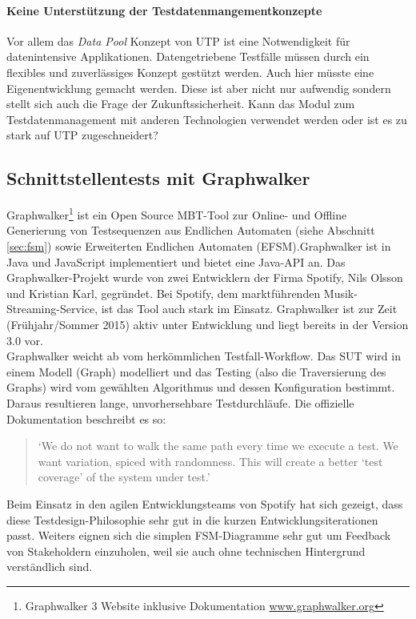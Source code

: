 \paragraph{Keine Unterstützung der Testdatenmangementkonzepte}
Vor allem das \textit{Data Pool} Konzept von UTP ist eine Notwendigkeit für datenintensive Applikationen. Datengetriebene Testfälle müssen durch ein flexibles und zuverlässiges Konzept gestützt werden. Auch hier müsste eine Eigenentwicklung gemacht werden. Diese ist aber nicht nur aufwendig sondern stellt sich auch die Frage der Zukunftssicherheit. Kann das Modul zum Testdatenmanagement mit anderen Technologien verwendet werden oder ist es zu stark auf UTP zugeschneidert?

\subsection{Schnittstellentests mit Graphwalker}
\label{sec:graphwalker}
Graphwalker\footnote{Graphwalker 3 Website inklusive Dokumentation \url{www.graphwalker.org}} ist ein Open Source MBT-Tool zur Online- und Offline Generierung von Testsequenzen aus Endlichen Automaten (siehe Abschnitt \ref{sec:fsm}) sowie Erweiterten Endlichen Automaten (EFSM).Graphwalker ist in Java und JavaScript implementiert und bietet eine Java-API an. Das Graphwalker-Projekt wurde von zwei Entwicklern der Firma Spotify, Nils Olsson und Kristian Karl, gegründet. Bei Spotify, dem marktführenden Musik-Streaming-Service, ist das Tool auch stark im Einsatz. Graphwalker ist zur Zeit (Frühjahr/Sommer 2015) aktiv unter Entwicklung und liegt bereits in der Version 3.0 vor.\\
Graphwalker weicht ab vom herkömmlichen Testfall-Workflow. Das SUT wird in einem Modell (Graph) modelliert und das Testing (also die Traversierung des Graphs) wird vom gewählten Algorithmus und dessen Konfiguration bestimmt. Daraus resultieren lange, unvorhersehbare Testdurchläufe. Die offizielle Dokumentation beschreibt es so:

\begin{quote}
`We do not want to walk the same path every time we execute a test. We want variation, spiced with randomness. This will create a better `test coverage' of the system under test.'\cite{_graphwalker_2015}
\end{quote}

Beim Einsatz in den agilen Entwicklungsteams von Spotify hat sich gezeigt, dass diese Testdesign-Philosophie sehr gut in die kurzen Entwicklungsiterationen passt. Weiters eignen sich die simplen FSM-Diagramme sehr gut um Feedback von Stakeholdern einzuholen, weil sie auch ohne technischen Hintergrund verständlich sind.

